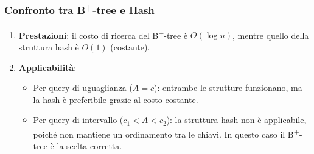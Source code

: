 \subsubsection{Confronto tra B\textsuperscript{+}-tree e Hash}

\begin{enumerate}
	\item \textbf{Prestazioni}: il costo di ricerca del B\textsuperscript{+}-tree è $O(\log n)$, mentre quello della struttura hash è $O(1)$ (costante).
	
	\item \textbf{Applicabilità}:
	\begin{itemize}
		\item Per query di uguaglianza ($A = c$): entrambe le strutture funzionano, ma la hash è preferibile grazie al costo costante.
		\item Per query di intervallo ($c_1 < A < c_2$): la struttura hash non è applicabile, poiché non mantiene un ordinamento tra le chiavi. In questo caso il B\textsuperscript{+}-tree è la scelta corretta.
	\end{itemize}
\end{enumerate}